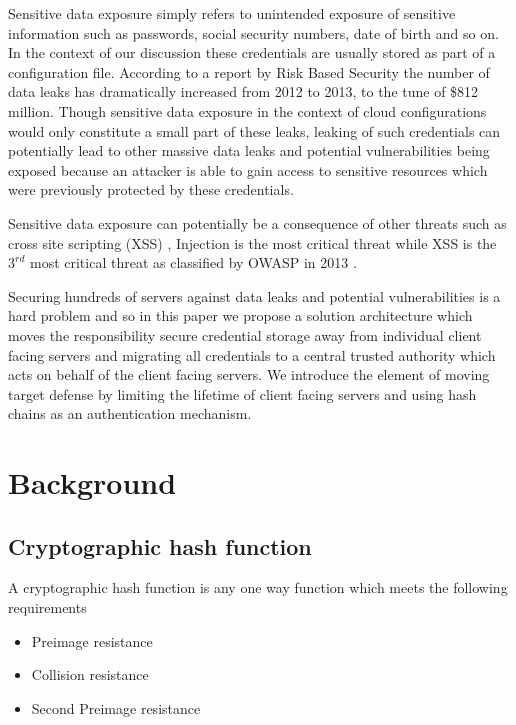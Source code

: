\documentclass{sig-alternate-05-2015}
\begin{document}
Sensitive data exposure simply refers to unintended exposure of sensitive information such as passwords, social security numbers, date of birth and so on. In the context of our discussion these credentials are usually stored as part of a configuration file. According to a report by Risk Based Security \cite{risk_based_executives_2014} \cite{shu_privacy-preserving_2015} the number of data leaks has dramatically increased from 2012 to 2013, to the tune of \$812 million. Though sensitive data exposure in the context of cloud configurations would only constitute a small part of these leaks, leaking of such credentials can potentially lead to other massive data leaks and potential vulnerabilities being exposed because an attacker is able to gain access to sensitive resources which were previously protected by these credentials.

Sensitive data exposure can potentially be a consequence of other threats such as cross site scripting (XSS) \cite{louw_blueprint:_2009}, Injection is the most critical threat while XSS is the $3^{rd}$ most critical threat as classified by OWASP in 2013 \cite{wichers_owasp_2014}. 

Securing hundreds of servers against data leaks and potential vulnerabilities is a hard problem and so in this paper we propose a solution architecture which moves the responsibility secure credential storage away from individual client facing servers and migrating all credentials to a central trusted authority which acts on behalf of the client facing servers. We introduce the element of moving target defense by limiting the lifetime of client facing servers and using hash chains as an authentication mechanism.

\section*{Background}

 \subsection*{Cryptographic hash function \cite{rogaway_cryptographic_2004}} 
 A cryptographic hash function is any one way function which meets the following requirements 
 \begin{itemize} 
 \item Preimage resistance
 \item Collision resistance
 \item Second Preimage resistance
 \end{itemize}
 
\end{document}
